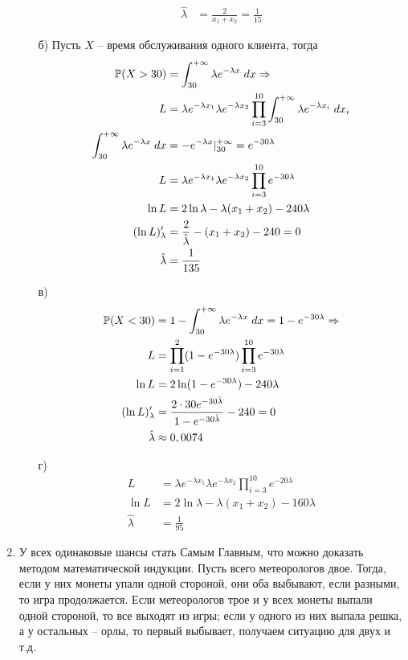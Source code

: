 \begin{enumerate}
\begin{enumerate}
\begin{align*}
\hat{\lambda}&=\frac{2}{x_1+x_2}=\frac{1}{15}
\end{align*}
\item[б)] Пусть $X$ – время обслуживания одного клиента, тогда
\begin{align*}
\P(X>30)&=\int^{+\infty}_{30}\lambda e^{-\lambda x} \; dx \Rightarrow\\
L&=\lambda e^{-\lambda x_1}\lambda e^{-\lambda x_2}\prod^{10}_{i=3}\int^{+\infty}_{30}\lambda e^{-\lambda x_i} \; dx_i\\
\int^{+\infty}_{30}\lambda e^{-\lambda x} \; dx&=-e^{-\lambda x}|^{+\infty}_{30}=e^{-30\lambda}\\
L&=\lambda e^{-\lambda x_1}\lambda e^{-\lambda x_2}\prod^{10}_{i=3}e^{-30\lambda}\\
\ln L&=2\ln \lambda-\lambda(x_1+x_2)-240\lambda\\
(\ln L)'_\lambda&=\frac{2}{\hat{\lambda}}-(x_1+x_2)-240=0\\
\hat{\lambda}&=\frac{1}{135}
\end{align*}
\item[в)] 
\begin{align*}
\P(X<30)&=1-\int^{+\infty}_{30}\lambda e^{-\lambda x} \; dx=1-e^{-30\lambda} \Rightarrow\\
L&=\prod^{2}_{i=1}(1-e^{-30\lambda})\prod^{10}_{i=3}e^{-30\lambda}\\
\ln L&=2\ln (1-e^{-30\lambda})-240\lambda\\
(\ln L)'_\lambda&=\frac{2\cdot30e^{-30\hat{\lambda}}}{1-e^{-30\hat{\lambda}}}-240=0\\
\hat{\lambda}&\approx0,0074
\end{align*}
\item[г)]
\begin{align*}
L&=\lambda e^{-\lambda x_1}\lambda e^{-\lambda x_2}\prod^{10}_{i=3}e^{-20\lambda}\\
\ln L&=2\ln \lambda-\lambda(x_1+x_2)-160\lambda\\
\hat{\lambda}&=\frac{1}{95}
\end{align*}
\end{enumerate}
\item У всех одинаковые шансы стать Самым Главным, что можно доказать методом математической индукции. Пусть всего метеорологов двое. Тогда, если у них монеты упали одной стороной, они оба выбывают, если разными, то игра продолжается. Если метеорологов трое и у всех монеты выпали одной стороной, то все выходят из игры; если у одного из них выпала решка, а у остальных – орлы, то первый выбывает, получаем ситуацию для двух и т.д.

\end{enumerate}
